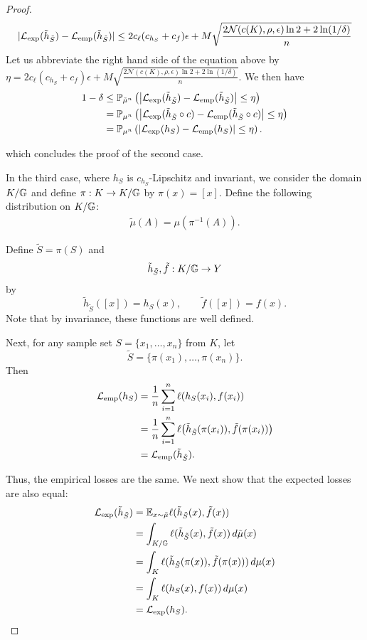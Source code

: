 \begin{proof}
    \begin{align*}
        |\mathcal{L}_{\mathrm{exp}}(\tilde{h}_{\tilde S}) - \mathcal{L}_{\mathrm{emp}}(\tilde{h}_{\tilde S})| \le 2c_\ell (c_{h_S}+c_f)\epsilon+M \sqrt{\frac{2\mathcal{N}( c(K), \rho,\epsilon)\ln 2 + 2 \ln(1/\delta)}{n}}
    \end{align*}
    Let us abbreviate the right hand side of the equation above by $\eta=2c_\ell (c_{h_S}+c_f)\epsilon+M \sqrt{\frac{2\mathcal{N}( c(K), \rho,\epsilon)\ln 2 + 2 \ln(1/\delta)}{n}}$. We then have
\begin{align*}
1-\delta
&\leq
\mathbb{P}_{\tilde{\mu}^n}
\left(
\left|
\mathcal{L}_{\mathrm{exp}}(\tilde h_{\tilde S})
-
\mathcal{L}_{\mathrm{emp}}(\tilde h_{\tilde S})
\right|
\leq \eta
\right)\\
&=
\mathbb{P}_{\mu^n}
\left(
\left|
\mathcal{L}_{\mathrm{exp}}(\tilde h_{\tilde S}\circ c)
-
\mathcal{L}_{\mathrm{emp}}(\tilde h_{\tilde S}\circ c)
\right|
\leq \eta
\right)\\
&=
\mathbb{P}_{\mu^n}
\left(
\left|
\mathcal{L}_{\mathrm{exp}}(h_S)
-
\mathcal{L}_{\mathrm{emp}}(h_S)
\right|
\leq \eta
\right).
\end{align*}


which concludes the proof of the second case.

In the third case, where $h_S$ is $c_{h_S}$-Lipschitz and invariant, we consider the domain $K/\mathbb{G}$ and define $\pi:K\to K/\mathbb{G}$ by $\pi(x)=[x]$. Define the following distribution on $K/\mathbb{G}$:
\begin{align*}
    \tilde{\mu}(A)=\mu(\pi^{-1}(A)).
\end{align*}

Define $\tilde S=\pi(S)$ and
\[
\tilde{h}_{\tilde S},\tilde{f}:K/\mathbb{G}\to Y
\]
by
\[
\tilde{h}_{\tilde S}([x])=h_S(x),
\qquad
\tilde{f}([x])=f(x).
\]
Note that by invariance, these functions are well defined.

Next, for any sample set $S=\{x_1,\ldots,x_n\}$ from $K$, let
\[
\tilde S=\{\pi(x_1),\ldots,\pi(x_n)\}.
\]
Then
\begin{align*}
\mathcal{L}_{\mathrm{emp}}(h_S)
&=
\frac{1}{n}\sum_{i=1}^n \ell(h_S(x_i),f(x_i))\\
&=
\frac{1}{n}\sum_{i=1}^n
\ell\bigl(\tilde{h}_{\tilde S}(\pi(x_i)),
          \tilde{f}(\pi(x_i))\bigr)\\
&=
\mathcal{L}_{\mathrm{emp}}(\tilde{h}_{\tilde S}).
\end{align*}

Thus, the empirical losses are the same. We next show that the expected losses are also equal:
\begin{align*}
\mathcal{L}_{\mathrm{exp}}(\tilde{h}_{\tilde S})
&=
\mathbb{E}_{x\sim\tilde{\mu}}
\ell(\tilde{h}_{\tilde S}(x),\tilde{f}(x))\\
&=
\int_{K/\mathbb{G}}
\ell(\tilde{h}_{\tilde S}(x),\tilde{f}(x))
\,d\tilde{\mu}(x)\\
&=
\int_K
\ell(\tilde{h}_{\tilde S}(\pi(x)),
     \tilde{f}(\pi(x)))
\,d\mu(x)\\
&=
\int_K
\ell(h_S(x),f(x))
\,d\mu(x)\\
&=
\mathcal{L}_{\mathrm{exp}}(h_S).
\end{align*}


\end{proof}
